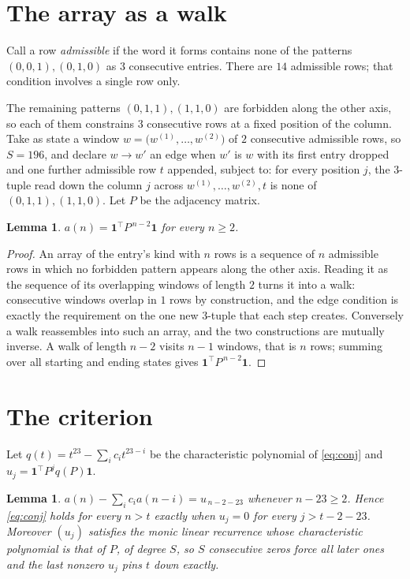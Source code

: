 \documentclass[11pt,a4paper]{article}
\theoremstyle{plain}
\newtheorem{lemma}[theorem]{Lemma}
\theoremstyle{definition}
\begin{document}
\section{The array as a walk}

Call a row \emph{admissible} if the word it forms contains none of the patterns
$(0,0,1), (0,1,0)$ as $3$ consecutive entries. There are $14$ admissible rows; that condition
involves a single row only.

The remaining patterns $(0,1,1), (1,1,0)$ are forbidden along the other axis, so each of them
constrains $3$ consecutive rows at a fixed position of the column. Take as state a
window $w=\bigl(w^{(1)},\dots,w^{(2)}\bigr)$ of $2$ consecutive admissible
rows, so $S=196$, and declare $w\to w'$ an edge when $w'$ is $w$ with its first entry
dropped and one further admissible row $t$ appended, subject to: for every position
$j$, the $3$-tuple read down the column $j$ across $w^{(1)},\dots,w^{(2)},t$
is none of $(0,1,1), (1,1,0)$. Let $P$ be the adjacency matrix.

\begin{lemma}\label{lem:walk}
$a(n)=\mathbf{1}^{\!\top}P^{\,n-2}\mathbf{1}$ for every $n\ge2$.
\end{lemma}

\begin{proof}
An array of the entry's kind with $n$ rows is a sequence of $n$ admissible rows in
which no forbidden pattern appears along the other axis. Reading it as the sequence of its
overlapping windows of length $2$ turns it into a walk: consecutive windows overlap in
$1$ rows by construction, and the edge condition is exactly the requirement on the one
new $3$-tuple that each step creates. Conversely a walk reassembles into such an array,
and the two constructions are mutually inverse. A walk of length $n-2$ visits $n-1$
windows, that is $n$ rows; summing over all starting and ending states gives
$\mathbf{1}^{\!\top}P^{\,n-2}\mathbf{1}$.
\end{proof}

\section{The criterion}

Let $q(t)=t^{23}-\sum_i c_i t^{23-i}$ be the characteristic polynomial of
\eqref{eq:conj} and $u_j=\mathbf{1}^{\!\top}P^{j}q(P)\mathbf{1}$.

\begin{lemma}\label{lem:crit}
$a(n)-\sum_i c_i a(n-i)=u_{\,n-2-23}$ whenever $n-23\ge2$. Hence
\eqref{eq:conj} holds for every $n>t$ exactly when $u_j=0$ for every
$j>t-2-23$. Moreover $(u_j)$ satisfies the monic linear recurrence whose
characteristic polynomial is that of $P$, of degree $S$, so $S$ consecutive zeros force all
later ones and the last nonzero $u_j$ pins $t$ down exactly.
\end{lemma}
\end{document}
